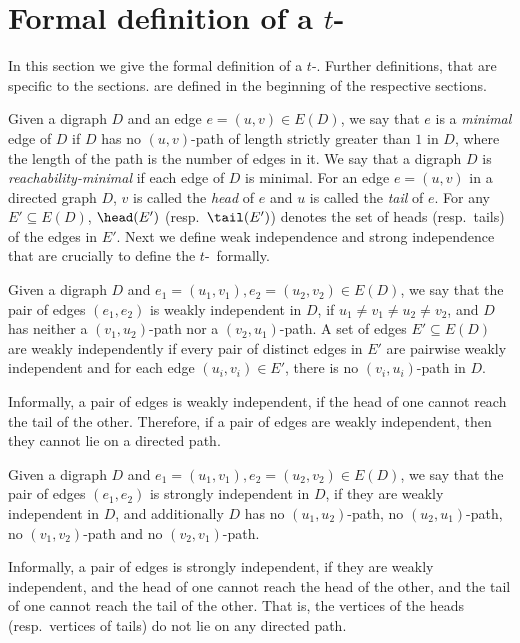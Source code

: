 \section{Formal definition of a $t$-\toughpair}\label{sec:prelims}
In this section we give the formal definition of a $t$-\toughpair.
Further definitions, that are specific to the sections. are defined in the beginning of the respective sections.

Given a digraph $D$ and an edge $e=(u,v) \in E(D)$, we say that $e$ is a {\em minimal} edge of $D$ if $D$ has no $(u,v)$-path of length strictly greater than $1$ in $D$, where the length of the path is the number of edges in it.
We say that a digraph $D$ is {\em reachability-minimal} if each edge of $D$ is minimal.
For an edge $e=(u,v)$ in a directed graph $D$, $v$ is called the {\em head} of $e$ and $u$ is called the {\em tail} of $e$. 
For any $E' \subseteq E(D)$, 
$\head(E')$ (resp.~$\tail(E')$) denotes the set of heads (resp.~tails) of the edges in $E'$.
Next we define weak independence and strong independence that are crucially to define the $t$-\toughpair\ formally.

\begin{definition}
Given a digraph $D$ and $e_1 = (u_1,v_1), e_2 =(u_2,v_2) \in E(D)$, 
we say that the pair of edges $(e_1,e_2)$ is weakly independent in $D$, 
if $u_1 \neq v_1 \neq u_2 \neq v_2$,  and
$D$ has neither a $(v_1,u_2)$-path nor a $(v_2,u_1)$-path. 
A set of edges $E' \subseteq E(D)$ are weakly independently if every pair of distinct edges in $E'$ are pairwise weakly independent and for each edge $(u_i,v_i) \in E'$, there is no $(v_i,u_i)$-path in $D$.

Informally, a pair of edges is weakly independent, if the head of one cannot reach the tail of the other. Therefore, if a pair of edges are weakly independent, then they cannot lie on a directed path.
\end{definition}


\begin{definition}
Given a digraph $D$ and $e_1 = (u_1,v_1), e_2 =(u_2,v_2) \in E(D)$, we say that the pair of edges $(e_1,e_2)$ is strongly independent in $D$, if they are weakly independent in $D$, and additionally $D$ has no $(u_1,u_2)$-path, no $(u_2,u_1)$-path, no $(v_1,v_2)$-path and no $(v_2,v_1)$-path. 

Informally, a pair of edges is strongly independent, if they are weakly independent, and the head of one cannot reach the head of the other, and the tail of one cannot reach the tail of the other. That is, the vertices of the heads (resp.~vertices of tails) do not lie on any directed path.
\end{definition}

